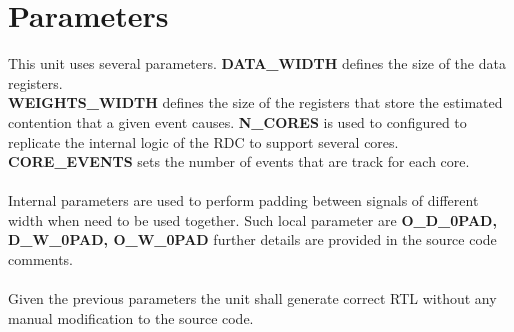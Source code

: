\section{Parameters}
\label{chapter3}
This unit uses several parameters. \textbf{DATA\_WIDTH} defines the size of the data registers.\\
\textbf{WEIGHTS\_WIDTH} defines the size of the registers that store the estimated contention that a given event causes.\textbf{ N\_CORES} is used to configured to replicate the internal logic of the RDC to support several cores. \textbf{CORE\_EVENTS} sets the number of events that are track for each core.\\
\\
Internal parameters are used to perform padding between signals of different width when need to be used together. Such local parameter are\textbf{ O\_D\_0PAD, D\_W\_0PAD, O\_W\_0PAD }further details are provided in the source code comments. \\
\\
Given the previous parameters the unit shall generate correct RTL without any manual modification to the source code.\\
\\